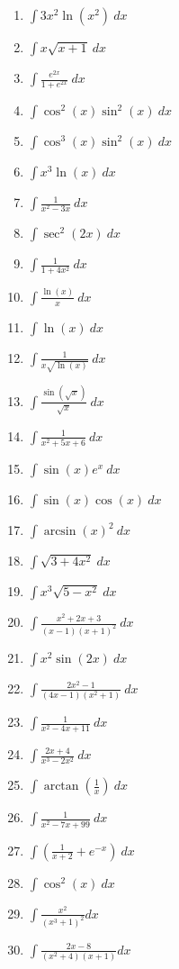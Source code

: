\documentclass{article}
\begin{document}
\begin{multicols}{4}
\begin{enumerate}
\item $\displaystyle \int 3x^2\ln(x^2)\ dx$
\item $\displaystyle \int x \sqrt{x+1}\ dx$
\item $\displaystyle \int \frac{e^{2 x}}{1+e^{2 x}} \ d x$
\item $\displaystyle \int  \cos^2(x)\sin^2(x)  \ d x$
\item $\displaystyle \int \cos ^3 (x) \sin ^2 (x)\ d x$
\item $\displaystyle \int x^3 \ln (x)\ d x$
\item $\displaystyle \int \frac{1}{x^2-3 x}\ dx$
\item $\displaystyle \int  \sec ^2(2 x)\ d x$
\item $\displaystyle \int  \frac{1}{1+4 x^2}\ dx$
\item $\displaystyle \int  \frac{\ln (x)}{x}\ d x$
\item $\displaystyle \int  \ln (x)\ d x$
\item $\displaystyle \int  \frac{1}{x\sqrt{\ln(x)}}\ d x$
\item $\displaystyle \int  \frac{\sin(\sqrt x)}{\sqrt x}\ d x$
\item $\displaystyle \int \frac{1}{x^2+5x+6} \ d x$
\item $\displaystyle \int  \sin(x)e^x \ d x$
\item $\displaystyle \int  \sin(x)\cos(x)\ d x$
\item $\displaystyle \int  \arcsin(x)^2\ d x$
\item $\displaystyle \int  \sqrt{3+4x^2}\ d x$
\item $\displaystyle \int  x^3\sqrt{5-x^2}\ d x$
\item $\displaystyle \int \frac{x^2+2 x+3}{(x-1)(x+1)^2}\ d x$
\item $\displaystyle \int x^2 \sin(2 x) \ d x$
\item $\displaystyle \int \frac{2x^2-1}{(4x-1)(x^2+1)} \ d x$
\item $\displaystyle \int \frac{1}{x^2-4x+11} \ d x$
\item $\displaystyle \int \frac{2x+4}{x^3-2x^2} \ d x$
\item $\displaystyle \int \arctan\left(\frac{1}{x}\right)\ d x$
\item $\displaystyle \int \frac{1}{x^2-7x+99}\ d x$
\item $\displaystyle \int\left( \frac{1}{x+2}+e^{-x}\right)\ d x$
\item $\displaystyle \int\cos^2(x)\ d x$
\item $\displaystyle \int\frac{x^2}{(x^3+1)^2} d x$
\item $\displaystyle \int\frac{2x-8}{(x^2+4)(x+1)} d x$
\end{enumerate}
\end{multicols}
\end{document}
